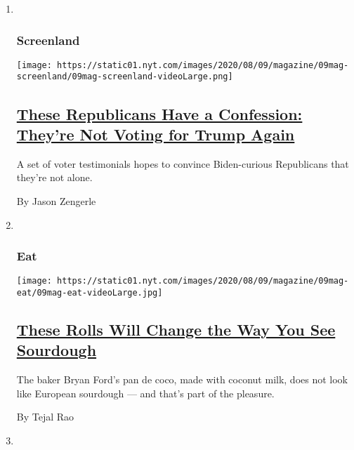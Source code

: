 \begin{enumerate}
\def\labelenumi{\arabic{enumi}.}
\item ~
  \hypertarget{screenland}{%
  \subsubsection{Screenland}\label{screenland}}

  \texttt{[image: https://static01.nyt.com/images/2020/08/09/magazine/09mag-screenland/09mag-screenland-videoLarge.png]}

  \hypertarget{these-republicans-have-a-confession-theyre-not-voting-for-trump-again}{%
  \subsection{\texorpdfstring{\href{/2020/08/05/magazine/republicans-confess-against-trump.html}{These
  Republicans Have a Confession: They're Not Voting for Trump
  Again}}{These Republicans Have a Confession: They're Not Voting for Trump Again}}\label{these-republicans-have-a-confession-theyre-not-voting-for-trump-again}}

  A set of voter testimonials hopes to convince Biden-curious
  Republicans that they're not alone.

  By Jason Zengerle
\item ~
  \hypertarget{eat}{%
  \subsubsection{Eat}\label{eat}}

  \texttt{[image: https://static01.nyt.com/images/2020/08/09/magazine/09mag-eat/09mag-eat-videoLarge.jpg]}

  \hypertarget{these-rolls-will-change-the-way-you-see-sourdough}{%
  \subsection{\texorpdfstring{\href{/2020/08/05/magazine/pan-de-coco-recipe-bryan-ford.html}{These
  Rolls Will Change the Way You See
  Sourdough}}{These Rolls Will Change the Way You See Sourdough}}\label{these-rolls-will-change-the-way-you-see-sourdough}}

  The baker Bryan Ford's pan de coco, made with coconut milk, does not
  look like European sourdough --- and that's part of the pleasure.

  By Tejal Rao
\item ~
  \hypertarget{the-ethicist}{%
}
\end{enumerate}

